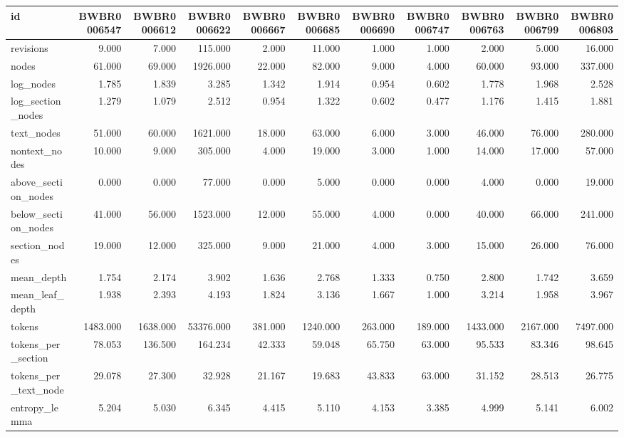 \begin{tabular}{lrrrrrrrrrr}
\toprule
id & BWBR0006547 & BWBR0006612 & BWBR0006622 & BWBR0006667 & BWBR0006685 & BWBR0006690 & BWBR0006747 & BWBR0006763 & BWBR0006799 & BWBR0006803 \\
\midrule
revisions & 9.000 & 7.000 & 115.000 & 2.000 & 11.000 & 1.000 & 1.000 & 2.000 & 5.000 & 16.000 \\
\cline{1-11}
nodes & 61.000 & 69.000 & 1926.000 & 22.000 & 82.000 & 9.000 & 4.000 & 60.000 & 93.000 & 337.000 \\
\cline{1-11}
log\_nodes & 1.785 & 1.839 & 3.285 & 1.342 & 1.914 & 0.954 & 0.602 & 1.778 & 1.968 & 2.528 \\
\cline{1-11}
log\_section\_nodes & 1.279 & 1.079 & 2.512 & 0.954 & 1.322 & 0.602 & 0.477 & 1.176 & 1.415 & 1.881 \\
\cline{1-11}
text\_nodes & 51.000 & 60.000 & 1621.000 & 18.000 & 63.000 & 6.000 & 3.000 & 46.000 & 76.000 & 280.000 \\
\cline{1-11}
nontext\_nodes & 10.000 & 9.000 & 305.000 & 4.000 & 19.000 & 3.000 & 1.000 & 14.000 & 17.000 & 57.000 \\
\cline{1-11}
above\_section\_nodes & 0.000 & 0.000 & 77.000 & 0.000 & 5.000 & 0.000 & 0.000 & 4.000 & 0.000 & 19.000 \\
\cline{1-11}
below\_section\_nodes & 41.000 & 56.000 & 1523.000 & 12.000 & 55.000 & 4.000 & 0.000 & 40.000 & 66.000 & 241.000 \\
\cline{1-11}
section\_nodes & 19.000 & 12.000 & 325.000 & 9.000 & 21.000 & 4.000 & 3.000 & 15.000 & 26.000 & 76.000 \\
\cline{1-11}
mean\_depth & 1.754 & 2.174 & 3.902 & 1.636 & 2.768 & 1.333 & 0.750 & 2.800 & 1.742 & 3.659 \\
\cline{1-11}
mean\_leaf\_depth & 1.938 & 2.393 & 4.193 & 1.824 & 3.136 & 1.667 & 1.000 & 3.214 & 1.958 & 3.967 \\
\cline{1-11}
tokens & 1483.000 & 1638.000 & 53376.000 & 381.000 & 1240.000 & 263.000 & 189.000 & 1433.000 & 2167.000 & 7497.000 \\
\cline{1-11}
tokens\_per\_section & 78.053 & 136.500 & 164.234 & 42.333 & 59.048 & 65.750 & 63.000 & 95.533 & 83.346 & 98.645 \\
\cline{1-11}
tokens\_per\_text\_node & 29.078 & 27.300 & 32.928 & 21.167 & 19.683 & 43.833 & 63.000 & 31.152 & 28.513 & 26.775 \\
\cline{1-11}
entropy\_lemma & 5.204 & 5.030 & 6.345 & 4.415 & 5.110 & 4.153 & 3.385 & 4.999 & 5.141 & 6.002 \\

\end{tabular}
